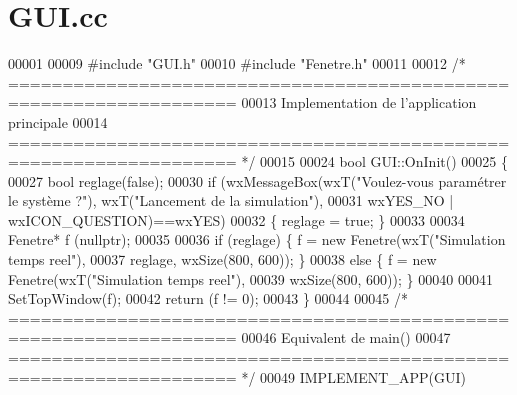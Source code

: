 \section{G\+U\+I.\+cc}
\label{_g_u_i_8cc_source}

\begin{DoxyCode}
00001 
00009 \textcolor{preprocessor}{#include "GUI.h"}
00010 \textcolor{preprocessor}{#include "Fenetre.h"}
00011 
00012 \textcolor{comment}{/* ===================================================================}
00013 \textcolor{comment}{   Implementation de l'application principale}
00014 \textcolor{comment}{   =================================================================== */}
00015 
00024 \textcolor{keywordtype}{bool} GUI::OnInit()
00025 \{
00027     \textcolor{keywordtype}{bool} reglage(\textcolor{keyword}{false});
00030     \textcolor{keywordflow}{if} (wxMessageBox(wxT(\textcolor{stringliteral}{"Voulez-vous paramétrer le système ?"}), wxT(\textcolor{stringliteral}{"Lancement de la simulation"}),
00031         wxYES\_NO | wxICON\_QUESTION)==wxYES)
00032     \{ reglage = \textcolor{keyword}{true}; \}
00033     
00034     Fenetre* f (\textcolor{keyword}{nullptr});
00035     
00036     \textcolor{keywordflow}{if} (reglage) \{ f = \textcolor{keyword}{new} Fenetre(wxT(\textcolor{stringliteral}{"Simulation temps reel"}),
00037                                    reglage, wxSize(800, 600)); \}
00038     \textcolor{keywordflow}{else} \{ f = \textcolor{keyword}{new} Fenetre(wxT(\textcolor{stringliteral}{"Simulation temps reel"}),
00039                            wxSize(800, 600)); \}
00040     
00041     SetTopWindow(f);
00042     \textcolor{keywordflow}{return} (f != 0);
00043 \}
00044 
00045 \textcolor{comment}{/* ===================================================================}
00046 \textcolor{comment}{   Equivalent de main()}
00047 \textcolor{comment}{   =================================================================== */}
00049 IMPLEMENT\_APP(GUI)
\end{DoxyCode}
